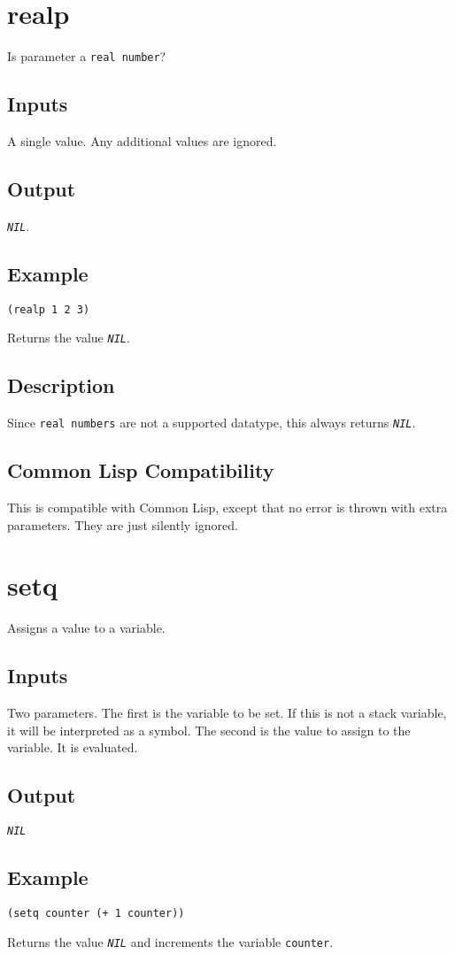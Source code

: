 \documentclass[10pt, openany]{book}
\newcommand{\constant}[1]{\emph{\texttt{#1}}}
\newcommand{\keyword}[1]{\texttt{#1}}
\newcommand{\datatype}[1]{\texttt{#1}}
\newcommand{\cl}{Common Lisp}
\begin{document}
\section{realp}
Is parameter a \datatype{real number}?
\subsection{Inputs}
A single value.  Any additional values are ignored.
\subsection{Output}
\constant{NIL}.
\subsection{Example}
\begin{lstlisting}
(realp 1 2 3)
\end{lstlisting}
Returns the value \constant{NIL}.
\subsection{Description}
Since \datatype{real numbers} are not a supported datatype, this always returns \constant{NIL}.
\subsection{Common Lisp Compatibility}
This is compatible with \cl, except that no error is thrown with extra parameters.  They are just silently ignored.

\section{setq}
Assigns a value to a variable.
\subsection{Inputs}
Two parameters.  The first is the variable to be set.  If this is not a stack variable, it will be interpreted as a symbol.  The second is the value to assign to the variable.  It is evaluated.
\subsection{Output}
\constant{NIL}
\subsection{Example}
\begin{lstlisting}
(setq counter (+ 1 counter))
\end{lstlisting}
Returns the value \constant{NIL} and increments the variable \keyword{counter}.
\end{document}
